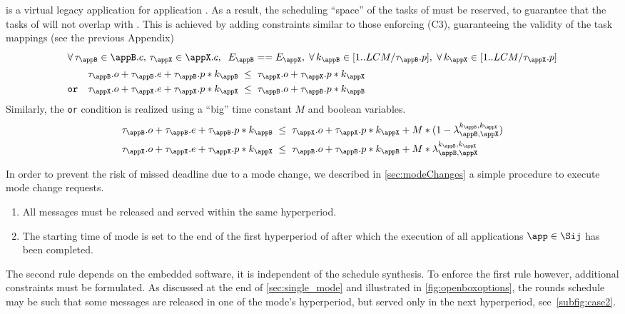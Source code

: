 \appB is a virtual legacy application for application \appX. As a result, the scheduling ``space'' of the tasks of \appB must be reserved, to guarantee that the tasks of \appX will not overlap with \appB. This is achieved by adding constraints similar to those enforcing (C3), guaranteeing the validity of the task mappings (see the previous Appendix)
%
\begin{align}
\intertext{%
$	\forall\,
		\tau_\appB \in \appB.c	, \,
		\tau_\appX \in \appX.c  , \;
		\; E_\appB == E_\appX, \;
	\forall\, k_\appB \in [1..LCM/\tau_\appB.p], \; \forall\, k_\appX \in [1..LCM/\tau_\appX.p]$}
	\tau_\appB.o + \tau_\appB.e + \tau_\appB.p*k_\appB
	&\; \leq \; \tau_\appX.o + \tau_\appX.p*k_\appX \\
\texttt{or} \quad
	\tau_\appX.o + \tau_\appX.e + \tau_\appX.p*k_\appX
	&\; \leq \; \tau_\appB.o + \tau_\appB.p*k_\appB
\end{align}
%
Similarly, the \; \texttt{or} \; condition is realized using a ``big'' time constant $M$ and boolean variables.
%
\begin{align}
\tau_\appB.o + \tau_\appB.e + \tau_\appB.p*k_\appB
	&\; \leq \; \tau_\appX.o + \tau_\appX.p*k_\appX
		+ M * (1 - \lambda_{\appB,\appX}^{k_\appB,k_\appX})\\
\tau_\appX.o + \tau_\appX.e + \tau_\appX.p*k_\appX
	&\; \leq \; \tau_\appB.o + \tau_\appB.p*k_\appB
		+ M * \lambda_{\appB,\appX}^{k_\appB,k_\appX}
\end{align}


\vspace{10pt}
In order to prevent the risk of missed deadline due to a mode change, we described in \cref{sec:modeChanges} a simple procedure to execute mode change requests.
\begin{enumerate}

	\item All messages must be released and served within the same hyperperiod.
	\label{rule1}

	\item The starting time \tjstart of mode \modej is set to the end of the first hyperperiod of \modei after which the execution of all applications $\app \in \Sij$ has been completed.

\end{enumerate}
%
The second rule depends on the embedded software, it is independent of the schedule synthesis.
To enforce the first rule however, additional constraints must be formulated. As discussed at the end of \cref{sec:single_mode} and illustrated in \cref{fig:openboxoptions}, the rounds schedule may be such that some messages are released in one of the mode's hyperperiod, but served only in the next hyperperiod, see~\cref{subfig:case2}.

